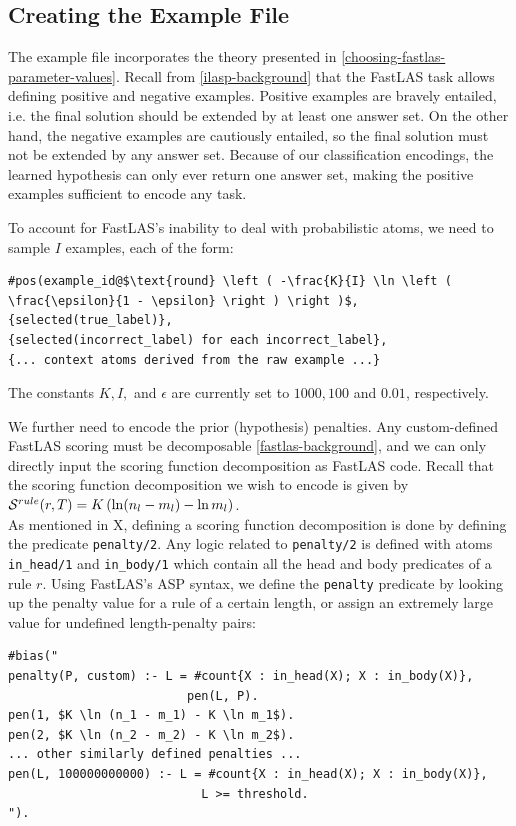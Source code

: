 \subsection{Creating the Example File}

The example file incorporates the theory presented in \ref{choosing-fastlas-parameter-values}.
Recall from \ref{ilasp-background} that the FastLAS task allows defining positive and negative examples.
Positive examples are bravely entailed, i.e. the final solution should be extended by at least one answer set.
On the other hand, the negative examples are cautiously entailed, so the final solution must not be extended by any answer set.
Because of our classification encodings, the learned hypothesis can only ever return one answer set, making the positive examples sufficient to encode any task.

To account for FastLAS's inability to deal with probabilistic atoms, we need to sample $I$ examples, each of the form:
\begin{lstlisting}
#pos(example_id@$\text{round} \left ( -\frac{K}{I} \ln \left ( \frac{\epsilon}{1 - \epsilon} \right ) \right )$,
{selected(true_label)},
{selected(incorrect_label) for each incorrect_label}, 
{... context atoms derived from the raw example ...}
\end{lstlisting}

The constants $K, I,$ and $\epsilon$ are currently set to $1000, 100$ and $0.01$, respectively.

We further need to encode the prior (hypothesis) penalties.
Any custom-defined FastLAS scoring must be decomposable \ref{fastlas-background}, and we can only directly input the scoring function decomposition as FastLAS code.
Recall that the scoring function decomposition we wish to encode is given by $\mathcal{S}^{rule}(r, T) = K \left (\ln (n_l - m_l) - \ln m_l  \right)$.  \\
As mentioned in X, defining a scoring function decomposition is done by defining the predicate \verb_penalty/2_. Any logic related to \verb_penalty/2_ is defined with atoms \verb+in_head/1+ and \verb+in_body/1+ which contain all the head and body predicates of a rule $r$.
Using FastLAS's ASP syntax, we define the \verb_penalty_ predicate by looking up the penalty value for a rule of a certain length, or assign an extremely large value for undefined length-penalty pairs:
\begin{lstlisting}
#bias("
penalty(P, custom) :- L = #count{X : in_head(X); X : in_body(X)}, 
                         pen(L, P).
pen(1, $K \ln (n_1 - m_1) - K \ln m_1$).
pen(2, $K \ln (n_2 - m_2) - K \ln m_2$).
... other similarly defined penalties ...
pen(L, 100000000000) :- L = #count{X : in_head(X); X : in_body(X)}, 
                           L >= threshold.
").
\end{lstlisting}

